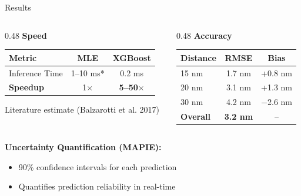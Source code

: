 \documentclass[aspectratio=169]{beamer}
\begin{document}
\begin{frame}{Results}

    \begin{columns}[T]
        \begin{column}{0.48\textwidth}
            \textbf{Speed}
            \vspace{0.3cm}

            \begin{tabular}{lcc}
                \toprule
                Metric & MLE & XGBoost \\
                \midrule
                Inference Time & 1--10 ms* & 0.2 ms \\
                \textbf{Speedup} & 1$\times$ & \textbf{5--50$\times$} \\
                \bottomrule
            \end{tabular}

            \vspace{0.3cm}
            {\footnotesize *Literature estimate (Balzarotti et al. 2017)}
        \end{column}

        \begin{column}{0.48\textwidth}
            \textbf{Accuracy}
            \vspace{0.3cm}

            \begin{tabular}{lcc}
                \toprule
                Distance & RMSE & Bias \\
                \midrule
                15 nm & 1.7 nm & +0.8 nm \\
                20 nm & 3.1 nm & +1.3 nm \\
                30 nm & 4.2 nm & $-$2.6 nm \\
                \midrule
                \textbf{Overall} & \textbf{3.2 nm} & -- \\
                \bottomrule
            \end{tabular}
        \end{column}
    \end{columns}

    \vspace{0.5cm}

    \textbf{Uncertainty Quantification (MAPIE):}
    \begin{itemize}
        \item 90\% confidence intervals for each prediction
        \item Quantifies prediction reliability in real-time
    \end{itemize}

\end{frame}
\end{document}
